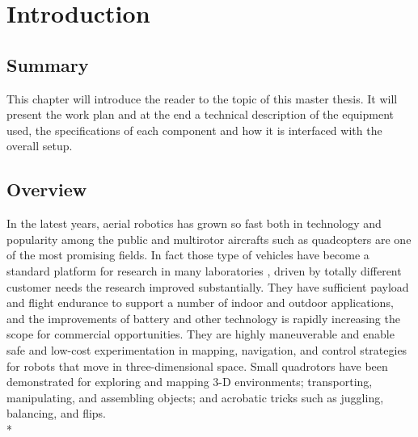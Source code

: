 

\chapter{Introduction}
\label{chap:introduction}
\ifpdf
    \graphicspath{{Introduction/Figures/PNG/}{Introduction/Figures/PDF/}{Introduction/Figures/}}
\else
    \graphicspath{{Introduction/Figures/EPS/}{Introduction/Figures/}}
\fi

\section*{Summary}

This chapter will introduce  the reader to the topic of this master thesis. It will present the work plan and at the end a technical description of the equipment used, the specifications of each component and how it is interfaced with the overall setup.

\section{Overview}

In the latest years, aerial robotics has grown so fast both in technology and popularity among the public and multirotor aircrafts such as quadcopters are one of the most promising fields. In fact those type of vehicles have become a standard platform for research in many laboratories , driven by totally different customer needs the research improved substantially. They have sufficient payload and flight endurance to support a number of indoor and outdoor applications, and the improvements of battery and other technology is rapidly increasing the scope for commercial opportunities. They are highly maneuverable and enable safe and low-cost experimentation in mapping, navigation, and control strategies for robots that move in three-dimensional space. Small quadrotors have been demonstrated for exploring and mapping 3-D environments; transporting, manipulating, and assembling objects; and acrobatic tricks such as juggling, balancing, and flips. \\*

